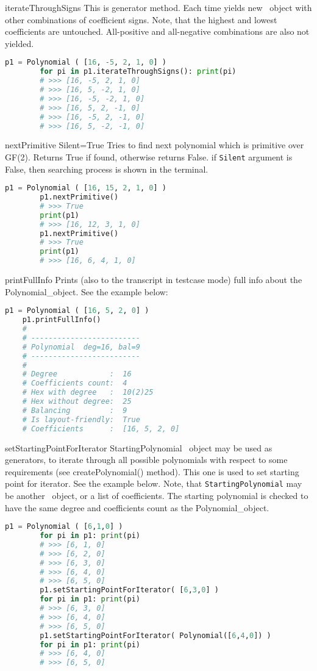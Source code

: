  {iterateThroughSigns} {} {
	This is generator method. Each time yields new \Polynomial\ object with other combinations of coefficient signs. Note, that the highest and lowest coefficients are untouched. All-positive and all-negative combinations are also not yielded.
}
\begin{lstlisting}[language=Python]
		p1 = Polynomial ( [16, -5, 2, 1, 0] )
		for pi in p1.iterateThroughSigns(): print(pi)
		# >>> [16, -5, 2, 1, 0]
		# >>> [16, 5, -2, 1, 0]
		# >>> [16, -5, -2, 1, 0]
		# >>> [16, 5, 2, -1, 0]
		# >>> [16, -5, 2, -1, 0]
		# >>> [16, 5, -2, -1, 0]
\end{lstlisting}

 {nextPrimitive} {Silent=True} {
	Tries to find next polynomial which is primitive over GF(2). Returns True if found, otherwise returns False.
	if \texttt{Silent} argument is False, then searching process is shown in the terminal.
}
\begin{lstlisting}[language=Python]
		p1 = Polynomial ( [16, 15, 2, 1, 0] )
		p1.nextPrimitive()
		# >>> True
		print(p1)
		# >>> [16, 12, 3, 1, 0]
		p1.nextPrimitive()
		# >>> True
		print(p1)
		# >>> [16, 6, 4, 1, 0]
\end{lstlisting}

 {printFullInfo} {} {
	Prints (also to the transcript in testcase mode) full info about the Polynomial\_object. See the example below:
}
\begin{lstlisting}[language=Python]
	p1 = Polynomial ( [16, 5, 2, 0] )
	p1.printFullInfo()
	# 
	# -------------------------
	# Polynomial  deg=16, bal=9
	# -------------------------
	# 
	# Degree            :  16
	# Coefficients count:  4
	# Hex with degree   :  10(2)25
	# Hex without degree:  25
	# Balancing         :  9
	# Is layout-friendly:  True
	# Coefficients      :  [16, 5, 2, 0]
\end{lstlisting}

 {setStartingPointForIterator} {StartingPolynomial} {
	\Polynomial\ object may be used as generators, to iterate through all possible polynomials with respect to some requirements (see createPolynomial() method). This one is used to set starting point for iterator. See the example below.
	Note, that \texttt{StartingPolynomial} may be another \Polynomial\ object, or a list of coefficients. The starting polynomial is checked to have the same degree and coefficients count as the Polynomial\_object.
}
\begin{lstlisting}[language=Python]
		p1 = Polynomial ( [6,1,0] )
		for pi in p1: print(pi)
		# >>> [6, 1, 0]
		# >>> [6, 2, 0]
		# >>> [6, 3, 0]
		# >>> [6, 4, 0]
		# >>> [6, 5, 0]
		p1.setStartingPointForIterator( [6,3,0] )
		for pi in p1: print(pi)
		# >>> [6, 3, 0]
		# >>> [6, 4, 0]
		# >>> [6, 5, 0]
		p1.setStartingPointForIterator( Polynomial([6,4,0]) )
		for pi in p1: print(pi)
		# >>> [6, 4, 0]
		# >>> [6, 5, 0]
\end{lstlisting}

